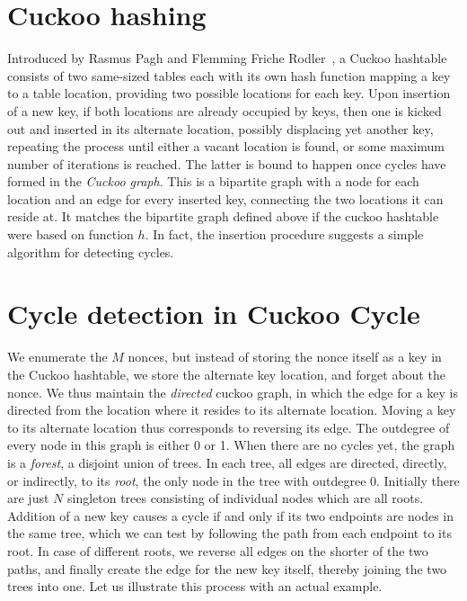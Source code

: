 \documentclass[11pt, oneside]{article}
\begin{document}
\section{Cuckoo hashing}
Introduced by Rasmus Pagh and Flemming Friche
Rodler~\cite{Pagh04cuckoohashing}, a Cuckoo hashtable consists of two
same-sized tables each with its own hash function mapping a key to a table
location, providing two possible locations for each key.
Upon insertion of a new key, if both locations are already occupied by keys,
then one is kicked out and inserted in its alternate location, possibly
displacing yet another key, repeating the process until either a vacant
location is found, or some maximum number of iterations is reached.
The latter is bound to happen once cycles have formed in the {\em Cuckoo graph}.
This is a bipartite graph with a node for each location and an
edge for every inserted key, connecting the two locations it can reside at.
It matches the bipartite graph defined above if the cuckoo hashtable
were based on function $h$.
In fact, the insertion procedure suggests a simple algorithm for detecting cycles.

\section{Cycle detection in Cuckoo Cycle}
We enumerate the $M$ nonces, but instead of storing the nonce itself as a key
in the Cuckoo hashtable, we store the alternate key location,
and forget about the nonce.  We thus maintain the {\em directed}
cuckoo graph, in which the edge for a key is directed from the location where
it resides to its alternate location.  Moving a key to its alternate location
thus corresponds to reversing its edge.  The outdegree of every node in this
graph is either 0 or 1.  When there are no cycles yet, the graph is a {\em
forest}, a disjoint union of trees.  In each tree, all edges are directed,
directly, or indirectly, to its {\em root}, the only node in the tree with
outdegree 0.  Initially there are just $N$ singleton trees consisting of
individual nodes which are all roots.
Addition of a new key causes a cycle if and only if its two endpoints are
nodes in the same tree, which we can test by following the path from each
endpoint to its root.
In case of different roots, we reverse all edges on the shorter of the two
paths, and finally create the edge for the new key itself, thereby joining
the two trees into one. Let us illustrate this process with an actual example.
\end{document}
